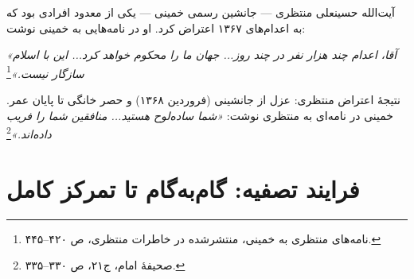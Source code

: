\documentclass[12pt,a4paper]{book}
\begin{document}
\begin{noteBox}
آیت‌الله حسینعلی منتظری — جانشین رسمی خمینی — یکی از معدود افرادی بود که به اعدام‌های ۱۳۶۷ اعتراض کرد. او در نامه‌هایی به خمینی نوشت:

\textit{«آقا، اعدام چند هزار نفر در چند روز... جهان ما را محکوم خواهد کرد... این با اسلام سازگار نیست.»}\footnote{نامه‌های منتظری به خمینی، منتشرشده در خاطرات منتظری، ص ۴۲۰–۴۴۵.}

نتیجهٔ اعتراض منتظری: عزل از جانشینی (فروردین ۱۳۶۸) و حصر خانگی تا پایان عمر. خمینی در نامه‌ای به منتظری نوشت: \textit{«شما ساده‌لوح هستید... منافقین شما را فریب داده‌اند.»}\footnote{صحیفهٔ امام، ج۲۱، ص ۳۳۰–۳۳۵.}
\end{noteBox}

\section{فرایند تصفیه: گام‌به‌گام تا تمرکز کامل}
\end{document}
